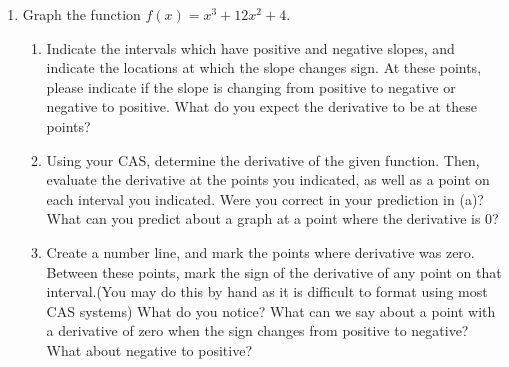 \documentclass{ximera}
\begin{document}
\begin{enumerate}
\item{Graph the function $f(x)=x^3+12x^2+4$.}
\begin{enumerate}
\item{Indicate the intervals which have positive and negative slopes, and indicate the locations at which the slope changes sign. At these points, please indicate if the slope is changing from positive to negative or negative to positive. What do you expect the derivative to be at these points?}
\item{Using your CAS, determine the derivative of the given function. Then, evaluate the derivative at the points you indicated, as well as a point on each interval you indicated. Were you correct in your prediction in (a)? What can you predict about a graph at a point where the derivative is 0?}
\item{Create a number line, and mark the points where derivative was zero. Between these points, mark the sign of the derivative of any point on that interval.(You may do this by hand as it is difficult to format using most CAS systems) What do you notice? What can we say about a point with a derivative of zero when the sign changes from positive to negative? What about negative to positive?}
\end{enumerate}


\end{enumerate}
\end{document}
